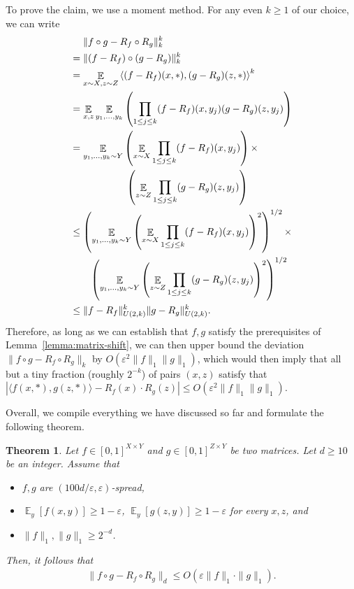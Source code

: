 \documentclass[11pt]{article}
\newtheorem{theorem}{Theorem}[section]
\DeclareMathOperator*{\E}{\mathbb{E}}
\newcommand{\1}{ \mathbbm{1}}
\newcommand{\eps}{\varepsilon}
\begin{document}
To prove the claim, we use a moment method. For any even $k\ge 1$ of our choice, we can write
\begin{align}
    &~~~~ \| f\circ g - R_f\circ R_g \|_k^k \notag \\
    &= \| (f-R_f) \circ (g-R_g) \|_k^k \notag \\
    &= \E_{x\sim X,z\sim Z} \left\langle (f-R_f)(x ,*), (g - R_g)(z, *)\right\rangle^k \notag \\
    &= \E_{x,z} \E_{y_1,\dots, y_k} \left( \prod_{1\le j\le k} (f-R_f)(x,y_j) (g-R_g)(z,y_j) \right) \notag \\
    &= \E_{y_1,\dots, y_k\sim Y} \left( \E_{x\sim X} \prod_{1\le j\le k} (f-R_f)(x,y_j) \right) \times \notag \\
    &~~~~~~~~~~~~~~~~~ \left( \E_{z\sim Z} \prod_{1\le j\le k} (g-R_g)(z,y_j) \right) \notag \\
    &\le \left(\E_{y_1,\dots, y_k\sim Y} \left( \E_{x\sim X} \prod_{1\le j\le k} (f-R_f)(x,y_j) \right)^2 \right)^{1/2}\times \notag \\
    &~~~~~~ \left(\E_{y_1,\dots, y_k\sim Y} \left( \E_{z\sim Z} \prod_{1\le j\le k} (g-R_g)(z,y_j) \right)^2 \right)^{1/2} \notag \\
    &\le \| f - R_f \|_{U(2,k)}^{k} \| g - R_g \|_{U(2,k)}^k. \label{equ:deviation fg to uniform}
\end{align}
Therefore, as long as we can establish that $f, g$ satisfy the prerequisites of Lemma~\ref{lemma:matrix-shift}, we can then upper bound the deviation $\| f\circ g - R_f \circ R_g \|_k$ by $O(\eps^2 \|f\|_1\|g\|_1)$, which would then imply that all but a tiny fraction (roughly $2^{-k}$) of pairs $(x, z)$ satisfy that $\left| \langle f(x,*),g(z,*)\rangle - R_f(x)\cdot R_g(z)\right| \le O(\eps^2 \|f\|_1\|g\|_1)$. 

Overall, we compile everything we have discussed so far and formulate the following theorem.
\begin{theorem}\label{thm: product of spread matrices}
Let $f\in [0,1]^{X\times Y}$ and $g\in [0,1]^{Z\times Y}$ be two matrices. Let $d\ge 10$ be an integer. Assume that
\begin{itemize}
    \item $f, g$ are $(100 d/\eps, \eps)$-spread,
    \item $\E_y[f(x,y)] \ge 1-\eps$, $\E_{y}[g(z,y)] \ge 1-\eps$ for every $x, z$, and
    \item $\|f\|_1,\|g\|_1\ge 2^{-d}$.
\end{itemize}
Then, it follows that
\begin{align*}
    \| f\circ g - R_f\circ R_g \|_{d} \le O(\eps\|f\|_1 \cdot \|g\|_1).
\end{align*}
\end{theorem}
\end{document}
